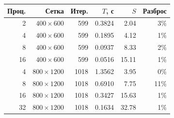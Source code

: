 \small
\begin{tabular}{rrrrrr}
\toprule
Проц. & Сетка & Итер. & $T$, с & $S$ & Разброс\\
\midrule
2 & $400\times600$ & 599 & 0.3824 & 2.04 & 3\%\\
4 & $400\times600$ & 599 & 0.1895 & 4.12 & 1\%\\
8 & $400\times600$ & 599 & 0.0937 & 8.33 & 2\%\\
16 & $400\times600$ & 599 & 0.0516 & 15.11 & 1\%\\
4 & $800\times1200$ & 1018 & 1.3562 & 3.95 & 0\%\\
8 & $800\times1200$ & 1018 & 0.6910 & 7.75 & 11\%\\
16 & $800\times1200$ & 1018 & 0.3427 & 15.63 & 1\%\\
32 & $800\times1200$ & 1018 & 0.1634 & 32.78 & 1\%\\
\bottomrule
\end{tabular}
